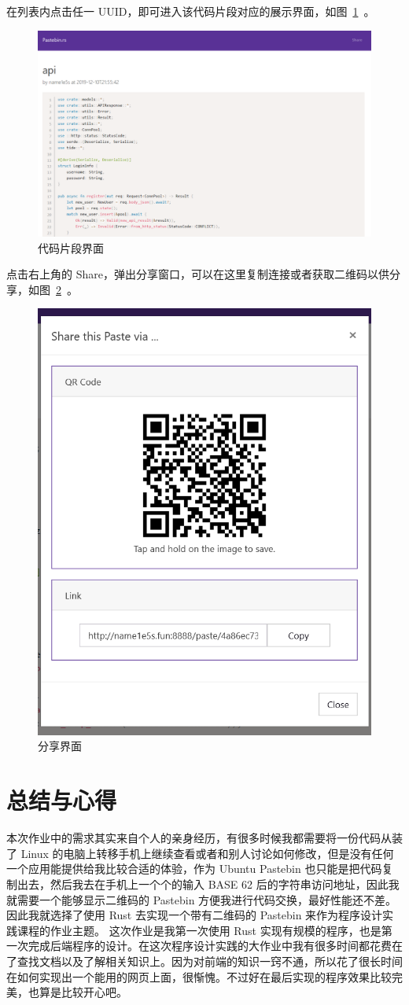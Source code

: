 \documentclass[ichigo,normal,cn]{elegantnote}
\begin{document}
在列表内点击任一 UUID，即可进入该代码片段对应的展示界面，如图~\ref{fig:paste}~。

\begin{figure}[!htbp]
    \centering
    \includegraphics[width=.8\textwidth]{paste}
    \caption{代码片段界面}
    \label{fig:paste}
\end{figure}

点击右上角的 Share，弹出分享窗口，可以在这里复制连接或者获取二维码以供分享，如图~\ref{fig:share}~。

\begin{figure}[!htbp]
    \centering
    \includegraphics[width=.5\textwidth]{share}
    \caption{分享界面}
    \label{fig:share}
\end{figure}
\newpage
\section{总结与心得}
本次作业中的需求其实来自个人的亲身经历，有很多时候我都需要将一份代码从装了 Linux 的电脑上转移手机上继续查看或者和别人讨论如何修改，但是没有任何一个应用能提供给我比较合适的体验，作为 Ubuntu Pastebin 也只能是把代码复制出去，然后我去在手机上一个个的输入 BASE 62 后的字符串访问地址，因此我就需要一个能够显示二维码的 Pastebin 方便我进行代码交换，最好性能还不差。因此我就选择了使用 Rust 去实现一个带有二维码的 Pastebin 来作为程序设计实践课程的作业主题。
这次作业是我第一次使用 Rust 实现有规模的程序，也是第一次完成后端程序的设计。在这次程序设计实践的大作业中我有很多时间都花费在了查找文档以及了解相关知识上。因为对前端的知识一窍不通，所以花了很长时间在如何实现出一个能用的网页上面，很惭愧。不过好在最后实现的程序效果比较完美，也算是比较开心吧。
\end{document}
